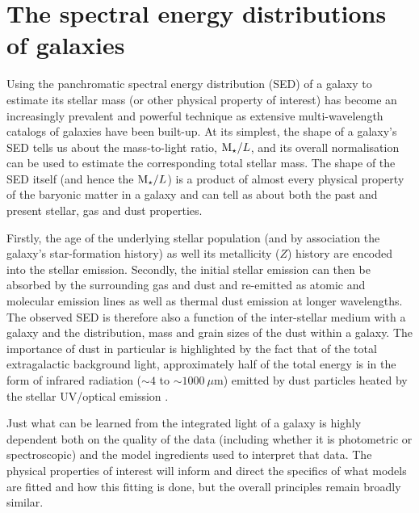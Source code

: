 \section{The spectral energy distributions of galaxies}\label{sec:intro-sed}
Using the panchromatic spectral energy distribution (SED) of a galaxy to estimate its stellar mass (or other physical property of interest) has become an increasingly prevalent and powerful technique as extensive multi-wavelength catalogs of galaxies have been built-up. At its simplest, the shape of a galaxy's SED tells us about the mass-to-light ratio, $\text{M}_{\star}/L$, and its overall normalisation can be used to estimate the corresponding total stellar mass. The shape of the SED itself (and hence the $\text{M}_{\star}/L$) is a product of almost every physical property of the baryonic matter in a galaxy and can tell as about both the past and present stellar, gas and dust properties.

Firstly, the age of the underlying stellar population (and by association the galaxy's star-formation history) as well its metallicity ($Z$) history are encoded into the stellar emission. Secondly, the initial stellar emission can then be absorbed by the surrounding gas and dust and re-emitted as atomic and molecular emission lines as well as thermal dust emission at longer wavelengths. The observed SED is therefore also a function of the inter-stellar medium with a galaxy and the distribution, mass and grain sizes of the dust within a galaxy. The importance of dust in particular is highlighted by the fact that of the total extragalactic background light, approximately half of the total energy is in the form of infrared radiation ($\sim 4$ to $\sim 1000~\mu$m) emitted by dust particles heated by the stellar UV/optical emission \citep{Hauser:2001fs}. 


Just what can be learned from the integrated light of a galaxy is highly dependent both on the quality of the data (including whether it is photometric or spectroscopic) and the model ingredients used to interpret that data. The physical properties of interest will inform and direct the specifics of what models are fitted and how this fitting is done, but the overall principles remain broadly similar.

